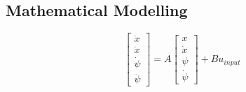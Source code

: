 \subsection{Mathematical Modelling}
$$
\begin{bmatrix}
    \dot{x} \\
    \ddot{x} \\
    \dot{\psi} \\
    \ddot{\psi}
\end{bmatrix}
= A
\begin{bmatrix}
    x \\
    \dot{x} \\
    \psi \\
    \dot{\psi}
\end{bmatrix}
+ B u_{input}
$$
